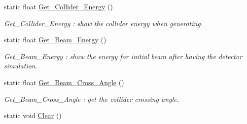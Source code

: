 \begin{DoxyCompactItemize}
static float \hyperlink{classToolSet_1_1CMC_a7143149e3db8c1e5055498c8aba88182}{Get\_\-Collider\_\-Energy} ()
\begin{DoxyCompactList}\small\item\em Get\_\-Collider\_\-Energy : show the collider energy when generating. \item\end{DoxyCompactList}\item 
static float \hyperlink{classToolSet_1_1CMC_afaf6f983eee33318bcaf7923cde7266e}{Get\_\-Beam\_\-Energy} ()
\begin{DoxyCompactList}\small\item\em Get\_\-Beam\_\-Energy : show the energy for initial beam after having the detector simulation. \item\end{DoxyCompactList}\item 
static float \hyperlink{classToolSet_1_1CMC_aab8dca236c78fffe1b63bac50583090a}{Get\_\-Beam\_\-Cross\_\-Angle} ()
\begin{DoxyCompactList}\small\item\em Get\_\-Beam\_\-Cross\_\-Angle : get the collider crossing angle. \item\end{DoxyCompactList}\item 
\hypertarget{classToolSet_1_1CMC_aaa16ba4a9f89c0ee01f8c7e2078d18d6}{
static void \hyperlink{classToolSet_1_1CMC_aaa16ba4a9f89c0ee01f8c7e2078d18d6}{Clear} ()}
\label{classToolSet_1_1CMC_aaa16ba4a9f89c0ee01f8c7e2078d18d6}


\end{DoxyCompactItemize}
